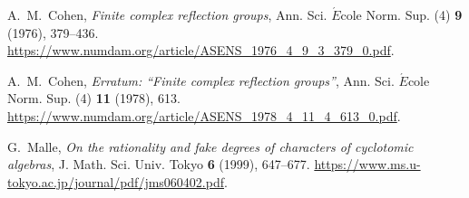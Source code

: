 A.~M.~Cohen, \emph{Finite complex reflection groups},
Ann. Sci. \(\acute E\)cole Norm. Sup. (4) \textbf{9} (1976), 379--436.
\url{https://www.numdam.org/article/ASENS_1976_4_9_3_379_0.pdf}.

A.~M.~Cohen, \emph{Erratum: ``Finite complex reflection groups''},
Ann. Sci. \(\acute E\)cole Norm. Sup. (4) \textbf{11} (1978), 613.
\url{https://www.numdam.org/article/ASENS_1978_4_11_4_613_0.pdf}.

G.~Malle, \emph{On the rationality and fake degrees of characters of
cyclotomic algebras}, J. Math. Sci. Univ. Tokyo \textbf{6} (1999), 647--677.
\url{https://www.ms.u-tokyo.ac.jp/journal/pdf/jms060402.pdf}.
